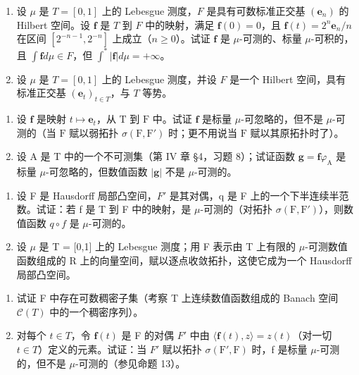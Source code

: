 \begin{enumerate}
\def\labelenumi{\arabic{enumi})}
\setcounter{enumi}{10}
\item
  设 \(\mu\) 是 \(T = [0,1]\) 上的 Lebesgue 测度，\(F\) 是具有可数标准正交基 \((\mathbf{e}_n)\) 的 Hilbert 空间。设 \(\mathbf{f}\) 是 \(T\) 到 \(F\) 中的映射，满足 \(\mathbf{f}(0) = 0\)，且 \(\mathbf{f}(t) = 2^n \mathbf{e}_n / n\) 在区间 \([2^{-n-1}, 2^{-n}]\) 上成立（\(n \geqslant 0\)）。试证 \(\mathbf{f}\) 是 \(\mu\)-可测的、标量 \(\mu\)-可积的，且 \(\int \mathbf{f} d\mu \in F\)，但 \(\int^* |\mathbf{f}| d\mu = +\infty\)。
\item
  设 \(\mu\) 是 \(T = [0,1]\) 上的 Lebesgue 测度，并设 \(F\) 是一个 Hilbert 空间，具有标准正交基 \((\mathbf{e}_t)_{t \in T}\)，与 \(T\) 等势。
\end{enumerate}

\begin{enumerate}
\def\labelenumi{\alph{enumi})}
\item
  设 \(\mathbf{f}\) 是映射 \(t \mapsto \mathbf{e}_t\)，从 \(\mathrm{T}\) 到 \(\mathrm{F}\) 中。试证 \(\mathbf{f}\) 是标量 \(\mu\)-可忽略的，但不是 \(\mu\)-可测的（当 \(\mathrm{F}\) 赋以弱拓扑 \(\sigma(\mathrm{F}, \mathrm{F}')\) 时；更不用说当 \(\mathrm{F}\) 赋以其原拓扑时了）。
\item
  设 A 是 T 中的一个不可测集（第 IV 章 §4，习题 8）；试证函数 \(\mathbf{g} = \mathbf{f}\varphi_{\mathrm{A}}\) 是标量 \(\mu\)-可忽略的，但数值函数 \(|\mathbf{g}|\) 不是 \(\mu\)-可测的。
\end{enumerate}

\begin{enumerate}
\def\labelenumi{\arabic{enumi})}
\setcounter{enumi}{12}
\item
  设 F 是 Hausdorff 局部凸空间，\(F'\) 是其对偶，q 是 F 上的一个下半连续半范数。试证：若 f 是 T 到 F 中的映射，是 \(\mu\)-可测的（对拓扑 \(\sigma(\mathrm{F},\mathrm{F}')\)），则数值函数 \(q \circ f\) 是 \(\mu\)-可测的。
\item
  设 \(\mu\) 是 T = {[}0,1{]} 上的 Lebesgue 测度；用 F 表示由 T 上有限的 \(\mu\)-可测数值函数组成的 R 上的向量空间，赋以逐点收敛拓扑，这使它成为一个 Hausdorff 局部凸空间。
\end{enumerate}

\begin{enumerate}
\def\labelenumi{\alph{enumi})}
\item
  试证 F 中存在可数稠密子集（考察 T 上连续数值函数组成的 Banach 空间 \(\mathcal{C}(T)\) 中的一个稠密序列）。
\item
  对每个 \(t \in T\)，令 \(\mathbf{f}(t)\) 是 F 的对偶 \(F'\) 中由 \(\langle\mathbf{f}(t), z\rangle = z(t)\)（对一切 \(t \in T\)）定义的元素。试证：当 \(F'\) 赋以拓扑 \(\sigma(\mathrm{F}', \mathrm{F})\) 时，f 是标量 \(\mu\)-可测的，但不是 \(\mu\)-可测的（参见命题 13）。
\end{enumerate}

